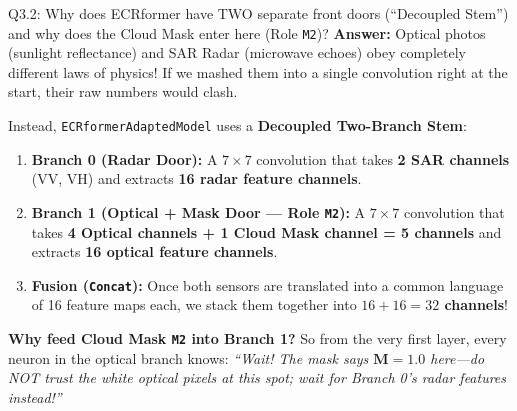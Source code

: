 \documentclass[11pt,a4paper]{article}
\begin{document}
\begin{qbox}{Q3.2: Why does ECRformer have TWO separate front doors (``Decoupled Stem'') and why does the Cloud Mask enter here (Role \texttt{M2})?}
\textbf{Answer:}
Optical photos (sunlight reflectance) and SAR Radar (microwave echoes) obey completely different laws of physics! If we mashed them into a single convolution right at the start, their raw numbers would clash.

Instead, \texttt{ECRformerAdaptedModel} uses a \textbf{Decoupled Two-Branch Stem}:
\begin{enumerate}[leftmargin=18pt]
    \item \textbf{Branch 0 (Radar Door):} A $7\times 7$ convolution that takes \textbf{2 SAR channels} (VV, VH) and extracts \textbf{16 radar feature channels}.
    \item \textbf{Branch 1 (Optical + Mask Door — Role \texttt{M2}):} A $7\times 7$ convolution that takes \textbf{4 Optical channels + 1 Cloud Mask channel = 5 channels} and extracts \textbf{16 optical feature channels}.
    \item \textbf{Fusion (\texttt{Concat}):} Once both sensors are translated into a common language of 16 feature maps each, we stack them together into \textbf{$16 + 16 = 32$ channels}!
\end{enumerate}
\textbf{Why feed Cloud Mask \texttt{M2} into Branch 1?} So from the very first layer, every neuron in the optical branch knows: \textit{``Wait! The mask says $\mathbf{M}=1.0$ here—do NOT trust the white optical pixels at this spot; wait for Branch 0's radar features instead!''}
\end{qbox}
\end{document}
